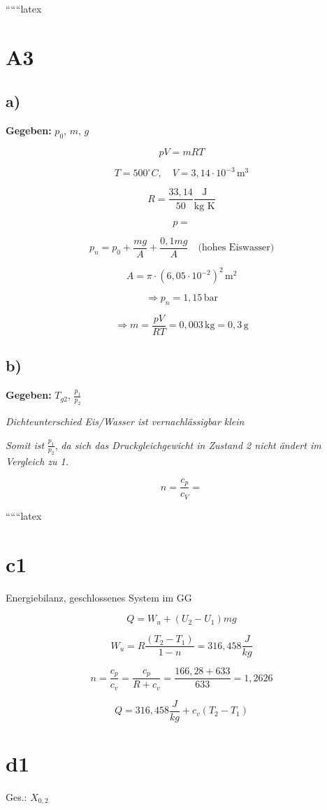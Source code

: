 
``````latex


\section*{A3}

\subsection*{a)}
\textbf{Gegeben:} $p_0$, $m$, $g$

\[
p V = m R T
\]

\[
T = 500^\circ C, \quad V = 3,14 \cdot 10^{-3} \, \text{m}^3
\]

\[
R = \frac{33,14}{50} \frac{\text{J}}{\text{kg K}}
\]

\[
p = 
\]

\[
p_n = p_0 + \frac{m g}{A} + \frac{0,1 m g}{A} \quad \text{(hohes Eiswasser)}
\]

\[
A = \pi \cdot (6,05 \cdot 10^{-2})^2 \, \text{m}^2
\]

\[
\Rightarrow p_n = 1,15 \, \text{bar}
\]

\[
\Rightarrow m = \frac{p V}{R T} = 0,003 \, \text{kg} = \boxed{0,3 \, \text{g}}
\]

\subsection*{b)}
\textbf{Gegeben:} $T_{g2}$, $\frac{p_1}{p_2}$

\textit{Dichteunterschied Eis/Wasser ist vernachlässigbar klein}

\textit{Somit ist} $\frac{p_1}{p_2}$, \textit{da sich das Druckgleichgewicht in Zustand 2 nicht ändert im Vergleich zu 1.}

\[
n = \frac{c_p}{c_V} = 
\]

``````latex


\section*{c1}
Energiebilanz, geschlossenes System im GG

\[
Q = W_u + (U_2 - U_1) mg
\]

\[
W_u = R \frac{(T_2 - T_1)}{1 - n} = 316,458 \frac{J}{kg}
\]

\[
n = \frac{c_p}{c_v} = \frac{c_p}{R + c_v} = \frac{166,28 + 633}{633} = 1,2626
\]

\[
Q = 316,458 \frac{J}{kg} + c_v (T_2 - T_1)
\]

\section*{d1}
Ges.: \(X_{0,2}\)

